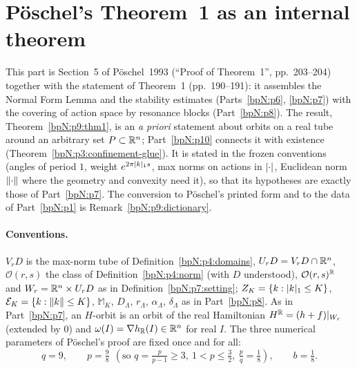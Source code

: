 \section{P\"oschel's Theorem~1 as an internal theorem}\label{bpN:p9}
\providecommand{\wn}[3]{\lvert #1\rvert_{#2,#3}}
\providecommand{\Dom}[2]{\mathcal D_{#1,#2}}
\providecommand{\Os}[2]{\mathcal O(#1,#2)}
\providecommand{\UD}[1]{U_{#1}D}
\providecommand{\Eb}{\mathcal E}
\providecommand{\Pj}{\Pi}
\begingroup\sloppy

This part is Section~5 of P\"oschel~1993 (``Proof of Theorem~1'', pp.~203--204) together with the statement of Theorem~1 (pp.~190--191): it assembles the Normal Form Lemma and the stability estimates (Parts~\ref{bpN:p6}, \ref{bpN:p7}) with the covering of action space by resonance blocks (Part~\ref{bpN:p8}). The result, Theorem~\ref{bpN:p9:thm1}, is an \emph{a priori} statement about orbits on a real tube around an arbitrary set $P\subset\mathbb{R}^n$; Part~\ref{bpN:p10} connects it with existence (Theorem~\ref{bpN:p3:confinement-glue}). It is stated in the frozen conventions (angles of period $1$, weight $e^{2\pi\lvert k\rvert_1s}$, max norms on actions in $\lvert \cdot\rvert$, Euclidean norm $\lVert \cdot\rVert$ where the geometry and convexity need it), so that its hypotheses are exactly those of Part~\ref{bpN:p7}. The conversion to P\"oschel's printed form and to the data of Part~\ref{bpN:p1} is Remark~\ref{bpN:p9:dictionary}.

\paragraph{Conventions.} $V_rD$ is the max-norm tube of Definition~\ref{bpN:p4:domains}, $\UD r=V_rD\cap\R^n$, $\Os rs$ the class of Definition~\ref{bpN:p4:norm} (with $D$ understood), $\Os rs^\R$ and $W_r=\R^n\times\UD r$ as in Definition~\ref{bpN:p7:setting}; $Z_K=\{k:\lvert k\rvert_1\le K\}$, $\Eb_K=\{k:\norm k\le K\}$, $\mathbb M_K$, $D_\Lambda$, $r_\Lambda$, $\alpha_\Lambda$, $\delta_\Lambda$ as in Part~\ref{bpN:p8}. As in Part~\ref{bpN:p7}, an $H$-orbit is an orbit of the real Hamiltonian $H^{\mathbb{R}}=(h+f)|_{W_r}$ (extended by $0$) and $\omega(I)=\nabla h_{\mathbb{R}}(I)\in\mathbb{R}^n$ for real $I$.
The three numerical parameters of P\"oschel's proof are fixed once and for all:
\[q=9,\qquad p=\tfrac98\ \ (\text{so }q=\tfrac p{p-1}\ge3,\ 1<p\le\tfrac32,\ \tfrac pq=\tfrac18),\qquad b=\tfrac18 .\]

